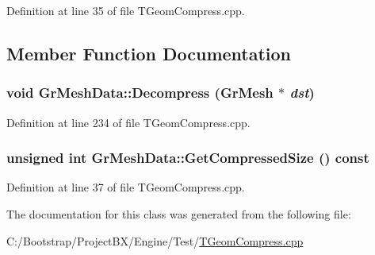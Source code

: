 Definition at line 35 of file TGeomCompress.cpp.

\subsection{Member Function Documentation}
\hypertarget{class_gr_mesh_data_63403cc06dd05ce7e08e51c67ce0f1bc}{
\subsubsection[{Decompress}]{\setlength{\rightskip}{0pt plus 5cm}void GrMeshData::Decompress ({\bf GrMesh} $\ast$ {\em dst})}}
\label{class_gr_mesh_data_63403cc06dd05ce7e08e51c67ce0f1bc}




Definition at line 234 of file TGeomCompress.cpp.\hypertarget{class_gr_mesh_data_24dcddc711188a114ce2b6ceec692320}{
\subsubsection[{GetCompressedSize}]{\setlength{\rightskip}{0pt plus 5cm}unsigned int GrMeshData::GetCompressedSize () const}}
\label{class_gr_mesh_data_24dcddc711188a114ce2b6ceec692320}




Definition at line 37 of file TGeomCompress.cpp.

The documentation for this class was generated from the following file:\begin{CompactItemize}
\item 
C:/Bootstrap/ProjectBX/Engine/Test/\hyperlink{_t_geom_compress_8cpp}{TGeomCompress.cpp}\end{CompactItemize}
